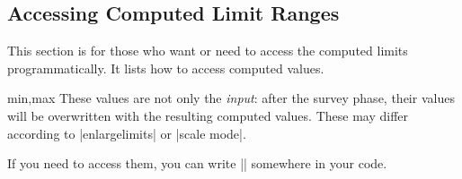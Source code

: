 \subsection{Accessing Computed Limit Ranges}

This section is for those who want or need to access the computed limits
programmatically. It lists how to access computed values.

\begin{pgfplotsxykeylist}{\x min,\x max}
    These values are not only the \emph{input}: after the survey phase, their
    values will be overwritten with the resulting computed values. These may
    differ according to |enlargelimits| or |scale mode|.

    If you need to access them, you can write ||
    somewhere in your code.
\end{pgfplotsxykeylist}

%
%
